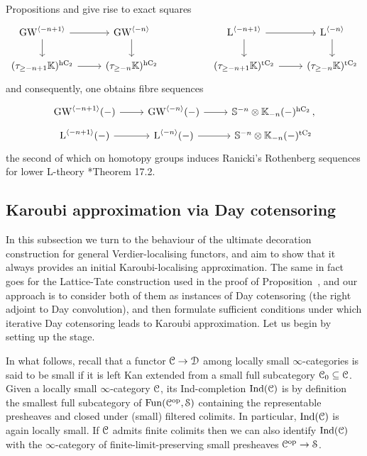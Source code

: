 \begin{remark}
\label{rem:spectral_rothenberg_lower_decoration}%
Propositions  and 
give rise to exact squares
\[
\begin{tikzcd}
	\GW^{\cotower{-n+1}} \ar[r] \ar[d] & \GW^{\cotower{-n}} \ar[d] && \L^{\cotower{-n+1}} \ar[r] \ar[d] & \L^{\cotower{-n}} \ar[d] \\
	(\tau_{\geq -n+1}\KK)^{\hC} \ar[r] & (\tau_{\geq -n}\KK)^{\hC} && (\tau_{\geq -n+1}\KK)^{\tC} \ar[r] & (\tau_{\geq -n}\KK)^{\tC}
\end{tikzcd}
\]
and consequently, one obtains fibre sequences
\[
\begin{tikzcd}[row sep=tiny]
	\GW^{\cotower{-n+1}}(-) \ar[r] & \GW^{\cotower{-n}}(-) \ar[r] & \mathbb{S}^{-n} \otimes \KK_{-n}(-)^{\hC}\,, \\
	\L^{\cotower{-n+1}}(-) \ar[r] & \L^{\cotower{-n}}(-) \ar[r] & \mathbb{S}^{-n} \otimes  \KK_{-n}(-)^{\tC}
\end{tikzcd}
\]
the second of which on homotopy groups induces Ranicki's Rothenberg sequences for lower L-theory \cite{Ranicki-lower}*{Theorem 17.2}. 
\end{remark}






\subsection{Karoubi approximation via Day cotensoring}
\label{subsection:karoubi-approximation-verdier}%



In this subsection we turn to the behaviour of the ultimate decoration construction for general Verdier-localising functors, and aim to show that it always provides an initial Karoubi-localising approximation. The same in fact goes for the Lattice-Tate construction used in the proof of Proposition~, and our approach is to consider both of them as instances of Day cotensoring (the right adjoint to Day convolution), and then formulate sufficient conditions under which iterative Day cotensoring leads to Karoubi approximation. Let us begin by setting up the stage.

In what follows, recall that a functor $\mathcal C \to \mathcal{D}$ among locally small $\infty$-categories is said to be small if it is left Kan extended from a small full subcategory $\mathcal C_0 \subseteq \mathcal C$. Given a locally small $\infty$-category $\mathcal C$, its Ind-completion $\operatorname{Ind}(\mathcal C)$ is by definition the smallest full subcategory of $\operatorname{Fun}(\mathcal C^\mathrm{op},\mathcal S)$ containing the representable presheaves and closed under (small) filtered colimits. In particular, $\operatorname{Ind}(\mathcal C)$ is again locally small. If $\mathcal C$ admits finite colimits then we can also identify $\operatorname{Ind}(\mathcal C)$ with the $\infty$-category of finite-limit-preserving small presheaves $\mathcal C^\mathrm{op} \to \mathcal S$. 


